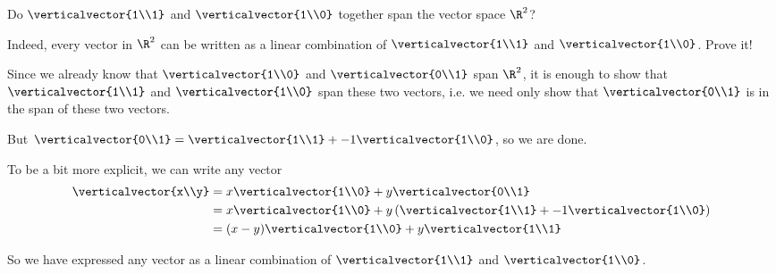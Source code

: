 \documentclass{ximera}
\begin{document}
\begin{question}
  Do $\verticalvector{1\\1}$ and $\verticalvector{1\\0}$ together span the vector space $\R^2$?

  \begin{solution}
    \begin{multiple-choice}
    \end{multiple-choice}
  \end{solution}

  Indeed, every vector in $\R^2$ can be written as a linear
  combination of $\verticalvector{1\\1}$ and $\verticalvector{1\\0}$.
  Prove it!

  \begin{free-response}
    Since we already know that $\verticalvector{1\\0}$ and $\verticalvector{0\\1}$ span $\R^2$,
    it is enough to show that $\verticalvector{1\\1}$ and $\verticalvector{1\\0}$ span these two vectors, i.e.
    we need only show that $\verticalvector{0\\1}$ is in the span of these two vectors.
    
    But $\verticalvector{0\\1} = \verticalvector{1\\1} +-1\verticalvector{1\\0}$, so we are done.
    
    To be a bit more explicit, we can write any vector \begin{align*}
      \verticalvector{x\\y} &= x\verticalvector{1\\0}+ y\verticalvector{0\\1}\\
      &= x\verticalvector{1\\0}+ y\left(\verticalvector{1\\1} +-1\verticalvector{1\\0}\right)\\
      &=(x-y)\verticalvector{1\\0}+y\verticalvector{1\\1}
    \end{align*}
    
    So we have expressed any vector as a linear combination of $\verticalvector{1\\1}$ and $\verticalvector{1\\0}$.
  \end{free-response} 
\end{question}
\end{document}
